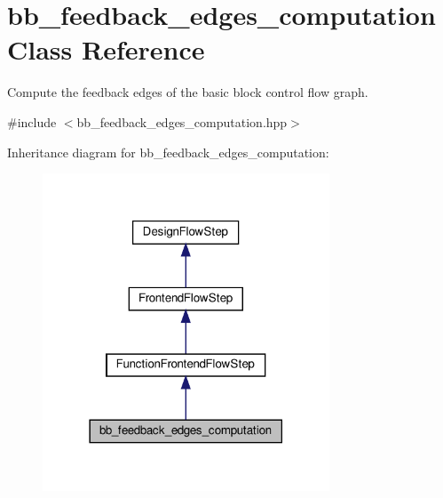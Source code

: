\hypertarget{classbb__feedback__edges__computation}{}\section{bb\+\_\+feedback\+\_\+edges\+\_\+computation Class Reference}
\label{classbb__feedback__edges__computation}


Compute the feedback edges of the basic block control flow graph.  




{\ttfamily \#include $<$bb\+\_\+feedback\+\_\+edges\+\_\+computation.\+hpp$>$}



Inheritance diagram for bb\+\_\+feedback\+\_\+edges\+\_\+computation\+:
\nopagebreak
\begin{figure}[H]
\begin{center}
\leavevmode
\includegraphics[width=242pt]{d7/dee/classbb__feedback__edges__computation__inherit__graph}
\end{center}
\end{figure}


